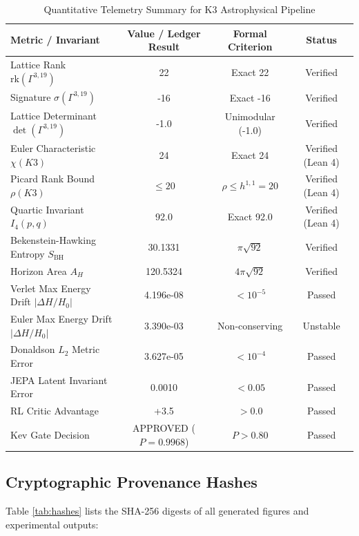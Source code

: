 \documentclass[11pt, a4paper]{article}
\begin{document}
\begin{table}[htbp]
\centering
\small
\caption{Quantitative Telemetry Summary for K3 Astrophysical Pipeline}
\label{tab:numerics}
\begin{tabular}{lccc}
\toprule
\textbf{Metric / Invariant} & \textbf{Value / Ledger Result} & \textbf{Formal Criterion} & \textbf{Status} \\
\midrule
Lattice Rank $\text{rk}(\Gamma^{3,19})$ & 22 & Exact 22 & Verified \\
Signature $\sigma(\Gamma^{3,19})$ & -16 & Exact -16 & Verified \\
Lattice Determinant $\det(\Gamma^{3,19})$ & -1.0 & Unimodular (-1.0) & Verified \\
Euler Characteristic $\chi(K3)$ & 24 & Exact 24 & Verified (Lean 4) \\
Picard Rank Bound $\rho(K3)$ & $\le 20$ & $\rho \le h^{1,1}=20$ & Verified (Lean 4) \\
Quartic Invariant $I_4(p, q)$ & 92.0 & Exact 92.0 & Verified (Lean 4) \\
Bekenstein-Hawking Entropy $S_{\text{BH}}$ & 30.1331 & $\pi \sqrt{92}$ & Verified \\
Horizon Area $A_H$ & 120.5324 & $4\pi \sqrt{92}$ & Verified \\
Verlet Max Energy Drift $|\Delta H/H_0|$ & 4.196e-08 & $< 10^{-5}$ & Passed \\
Euler Max Energy Drift $|\Delta H/H_0|$ & 3.390e-03 & Non-conserving & Unstable \\
Donaldson $L_2$ Metric Error & 3.627e-05 & $< 10^{-4}$ & Passed \\
JEPA Latent Invariant Error & 0.0010 & $< 0.05$ & Passed \\
RL Critic Advantage & +3.5 & $> 0.0$ & Passed \\
Kev Gate Decision & APPROVED ($P = 0.9968$) & $P > 0.80$ & Passed \\
\bottomrule
\end{tabular}
\end{table}

\subsection{Cryptographic Provenance Hashes}
Table \ref{tab:hashes} lists the SHA-256 digests of all generated figures and experimental outputs:
\end{document}
